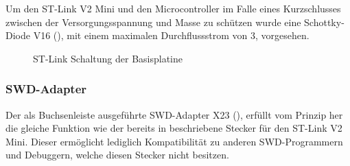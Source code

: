 Um den ST-Link V2 Mini und den Microcontroller im Falle eines Kurzschlusses zwischen der Versorgungsspannung und Masse zu schützen wurde eine Schottky-Diode V16 (), mit einem maximalen Durchflussstrom von \unit{3}{\ampere}, vorgesehen.

\begin{figure}[H]
    \centering
    \qquad
    \qquad
    \caption[ST-Link Schaltung der Basisplatine]{ST-Link Schaltung der \gls{Basisplatine}}
    \label{fig:basisplatine-swd}
\end{figure}

\subsubsection{SWD-Adapter}
Der als Buchsenleiste ausgeführte SWD-Adapter X23 (), erfüllt vom Prinzip her die gleiche Funktion wie der bereits in  beschriebene Stecker für den ST-Link V2 Mini. Dieser ermöglicht lediglich Kompatibilität zu anderen SWD-Programmern und Debuggern, welche diesen Stecker nicht besitzen.

